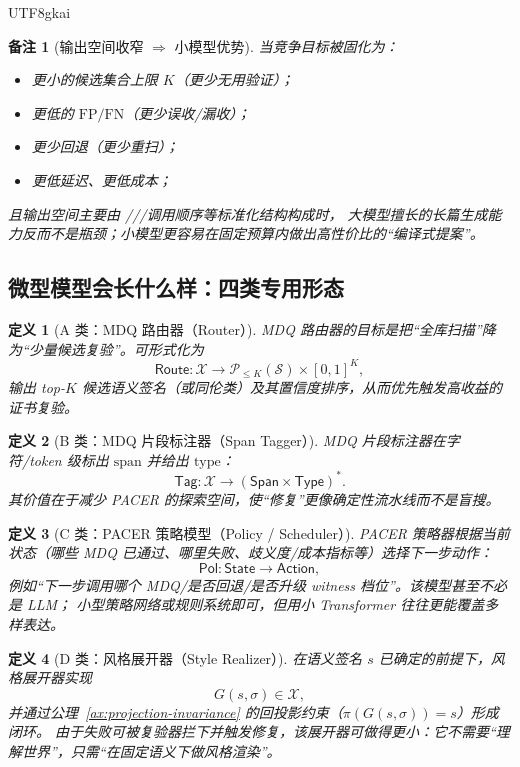 \documentclass[12pt]{article}
\newtheorem{definition}{定义}[section]
\newtheorem{remark}{备注}[section]
\newcommand{\code}[1]{\path{#1}}
\begin{document}
\begin{CJK*}{UTF8}{gkai}
\begin{remark}[输出空间收窄 $\Rightarrow$ 小模型优势]
当竞争目标被固化为：
\begin{itemize}
  \item 更小的候选集合上限 $K$（更少无用验证）；
  \item 更低的 $\mathrm{FP}/\mathrm{FN}$（更少误收/漏收）；
  \item 更少回退（更少重扫）；
  \item 更低延迟、更低成本；
\end{itemize}
且输出空间主要由 \code{class_id}/\code{span}/\code{mdq_type}/调用顺序等标准化结构构成时，
大模型擅长的长篇生成能力反而不是瓶颈；小模型更容易在固定预算内做出高性价比的“编译式提案”。
\end{remark}

\subsection{微型模型会长什么样：四类专用形态}
\label{subsec:micro-model-types}

\begin{definition}[A 类：MDQ 路由器（Router）]
MDQ 路由器的目标是把“全库扫描”降为“少量候选复验”。可形式化为
\[
\mathsf{Route}:\mathcal{X}\to \mathcal{P}_{\le K}(\mathcal{S})\times [0,1]^K,
\]
输出 top-$K$ 候选语义签名（或同伦类）及其置信度排序，从而优先触发高收益的证书复验。
\end{definition}

\begin{definition}[B 类：MDQ 片段标注器（Span Tagger）]
MDQ 片段标注器在字符/token 级标出 $\mathrm{span}$ 并给出 $\mathrm{type}$：
\[
\mathsf{Tag}:\mathcal{X}\to (\mathsf{Span}\times \mathsf{Type})^{\ast}.
\]
其价值在于减少 PACER 的探索空间，使“修复”更像确定性流水线而不是盲搜。
\end{definition}

\begin{definition}[C 类：PACER 策略模型（Policy / Scheduler）]
PACER 策略器根据当前状态（哪些 MDQ 已通过、哪里失败、歧义度/成本指标等）选择下一步动作：
\[
\mathsf{Pol}:\mathsf{State}\to \mathsf{Action},
\]
例如“下一步调用哪个 MDQ/是否回退/是否升级 witness 档位”。该模型甚至不必是 LLM；
小型策略网络或规则系统即可，但用小 Transformer 往往更能覆盖多样表达。
\end{definition}

\begin{definition}[D 类：风格展开器（Style Realizer）]
在语义签名 $s$ 已确定的前提下，风格展开器实现
\[
G(s,\sigma)\in\mathcal{X},
\]
并通过公理~\ref{ax:projection-invariance} 的回投影约束（$\pi(G(s,\sigma))=s$）形成闭环。
由于失败可被复验器拦下并触发修复，该展开器可做得更小：它不需要“理解世界”，只需“在固定语义下做风格渲染”。
\end{definition}


\end{CJK*}
\end{document}
